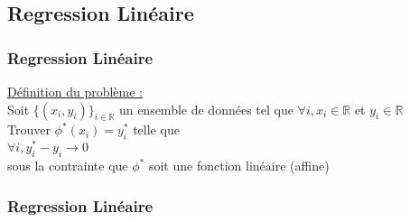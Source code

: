 \subsection{Regression Linéaire}

\begin{frame}
  \frametitle{Regression Linéaire}
  \underline{Définition du problème :}\\
  \newline
  Soit $\{( x_i , y_i)\}_{i \in \mathbb{R}}$ un ensemble de données tel que $\forall i, x_i \in \mathbb{R}$ et $y_i \in \mathbb{R}$ \\
  \newline
  Trouver $\phi^*(x_i) = y_i^*$ telle que \\
  \newline
  $\forall i, y^*_i-y_i \rightarrow 0$ \\
  sous la contrainte que $\phi^*$ soit une fonction linéaire (affine)
\end{frame}

\begin{frame}
  \frametitle{Regression Linéaire}
\end{frame}
